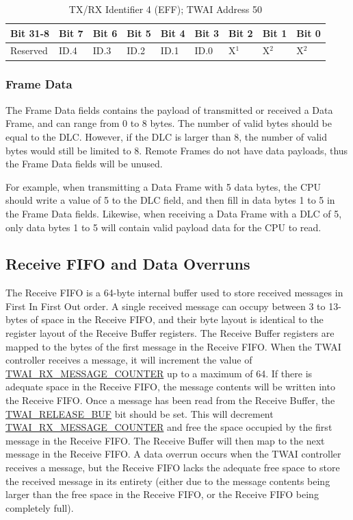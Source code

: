 \documentclass[main\_\_EN.tex]{subfiles}
\begin{document}
\begin{longtable}[c]{|p{1.4cm}|p{1.4cm}|p{1.4cm}|p{1.4cm}|p{1.4cm}|p{1.4cm}|p{1.4cm}|p{1.4cm}|p{1.4cm}|}
    \caption{TX/RX Identifier 4 (EFF); TWAI Address \hexprefix{}50}
    \label{table:tx_id4_eff}\\
    \hline
       \rowcolor{lightgray}
    Bit 31-8 & Bit 7 & Bit 6 & Bit 5 & Bit 4 & Bit 3 & Bit 2 & Bit 1 & Bit 0\\
    \hline
    Reserved & ID.4 & ID.3 & ID.2 & ID.1 & ID.0 & X$^1$ & X$^2$ & X$^2$\\
    \hline
\end{longtable}

\subsubsection{Frame Data}
The Frame Data fields contains the payload of transmitted or received a Data Frame, and can range from 0 to 8 bytes. The number of valid bytes should be equal to the DLC. However, if the DLC is larger than 8, the number of valid bytes would still be limited to 8. Remote Frames do not have data payloads, thus the Frame Data fields will be unused.

For example, when transmitting a Data Frame with 5 data bytes, the CPU should write a value of 5 to the DLC field, and then fill in data bytes 1 to 5 in the Frame Data fields. Likewise, when receiving a Data Frame with a DLC of 5, only data bytes 1 to 5 will contain valid payload data for the CPU to read.

\subsection{Receive FIFO and Data Overruns}

The Receive FIFO is a 64-byte internal buffer used to store received messages in First In First Out order. A single received message can occupy between 3 to 13-bytes of space in the Receive FIFO, and their byte layout is identical to the register layout of the Receive Buffer registers. The Receive Buffer registers are mapped to the bytes of the first message in the Receive FIFO.
When the TWAI controller receives a message, it will increment the value of \hyperref[fielddesc:TWAIRXMESSAGECOUNTER]{TWAI\_RX\_MESSAGE\_COUNTER} up to a maximum of 64. If there is adequate space in the Receive FIFO, the message contents will be written into the Receive FIFO. Once a message has been read from the Receive Buffer, the \hyperref[fielddesc:TWAIRELEASEBUF]{TWAI\_RELEASE\_BUF} bit should be set. This will decrement \hyperref[fielddesc:TWAIRXMESSAGECOUNTER]{TWAI\_RX\_MESSAGE\_COUNTER} and free the space occupied by the first message in the Receive FIFO. The Receive Buffer will then map to the next message in the Receive FIFO.
A data overrun occurs when the TWAI controller receives a message, but the Receive FIFO lacks the adequate free space to store the received message in its entirety (either due to the message contents being larger than the free space in the Receive FIFO, or the Receive FIFO being completely full).
\end{document}
